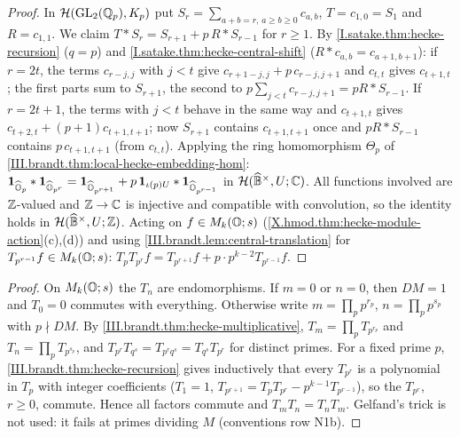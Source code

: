 \begin{theorem}
\end{theorem}
\begin{proof}
In $\mathcal H(\mathrm{GL}_2(\mathbb{Q}_p),K_p)$ put $S_r=\sum_{a+b=r,\,a\ge b\ge0}c_{a,b}$, $T=c_{1,0}=S_1$ and $R=c_{1,1}$. We claim $T*S_r=S_{r+1}+p\,R*S_{r-1}$ for $r\ge1$. By
\cref{I.satake.thm:hecke-recursion} ($q=p$) and \cref{I.satake.thm:hecke-central-shift} ($R*c_{a,b}=c_{a+1,b+1}$): if $r=2t$, the terms $c_{r-j,j}$ with
$j<t$ give $c_{r+1-j,j}+p\,c_{r-j,j+1}$ and $c_{t,t}$ gives $c_{t+1,t}$; the first parts sum to $S_{r+1}$, the second to $p\sum_{j<t}c_{r-j,j+1}=pR*S_{r-1}$. If
$r=2t+1$, the terms with $j<t$ behave in the same way and $c_{t+1,t}$ gives $c_{t+2,t}+(p+1)c_{t+1,t+1}$; now $S_{r+1}$ contains $c_{t+1,t+1}$ once and
$pR*S_{r-1}$ contains $p\,c_{t+1,t+1}$ (from $c_{t,t}$). Applying the ring homomorphism $\Theta_p$ of \cref{III.brandt.thm:local-hecke-embedding-hom}:
$\mathbf 1_{\widehat{\mathbb{O}}_p}*\mathbf 1_{\widehat{\mathbb{O}}_{p^r}}=\mathbf 1_{\widehat{\mathbb{O}}_{p^{r+1}}}+p\,\mathbf 1_{\iota(p)U}*\mathbf 1_{\widehat{\mathbb{O}}_{p^{r-1}}}$ in $\mathcal H(\widehat{\mathbb{B}}^\times,U;\mathbb{C})$. All
functions involved are $\mathbb{Z}$-valued and $\mathbb{Z}\to\mathbb{C}$ is injective and compatible with convolution, so the identity holds in $\mathcal H(\widehat{\mathbb{B}}^\times,U;\mathbb{Z})$. Acting
on $f\in M_k(\mathbb{O};s)$ (\cref{X.hmod.thm:hecke-module-action}(c),(d)) and using \cref{III.brandt.lem:central-translation} for $T_{p^{r-1}}f\in M_k(\mathbb{O};s)$:
$T_pT_{p^r}f=T_{p^{r+1}}f+p\cdot p^{k-2}T_{p^{r-1}}f$.
\end{proof}

\begin{theorem}[commutativity]
\end{theorem}
\begin{proof}
On $M_k(\mathbb{O};s)$ the $T_n$ are endomorphisms. If $m=0$ or $n=0$, then $DM=1$ and $T_0=0$ commutes with everything. Otherwise write
$m=\prod_pp^{r_p}$, $n=\prod_pp^{s_p}$ with $p\nmid DM$. By \cref{III.brandt.thm:hecke-multiplicative}, $T_m=\prod_pT_{p^{r_p}}$ and $T_n=\prod_pT_{p^{s_p}}$,
and $T_{p^r}T_{q^s}=T_{p^rq^s}=T_{q^s}T_{p^r}$ for distinct primes. For a fixed prime $p$, \cref{III.brandt.thm:hecke-recursion} gives inductively that every
$T_{p^r}$ is a polynomial in $T_p$ with integer coefficients ($T_1=1$, $T_{p^{r+1}}=T_pT_{p^r}-p^{k-1}T_{p^{r-1}}$), so the $T_{p^r}$, $r\ge0$, commute.
Hence all factors commute and $T_mT_n=T_nT_m$. Gelfand's trick is not used: it fails at primes dividing $M$ (conventions row N1b).
\end{proof}

